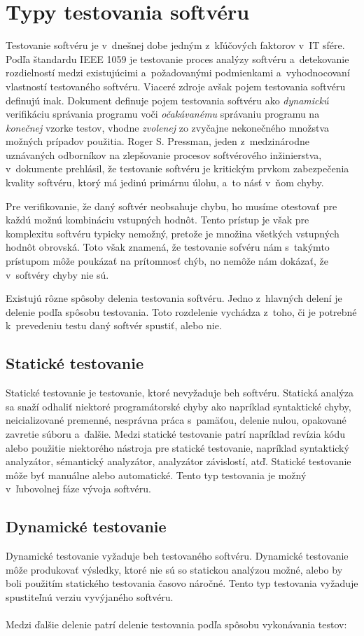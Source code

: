 \section{Typy testovania softvéru} 
\label{sekcia:typy_testovania}
Testovanie softvéru je v~dnešnej dobe jedným z~kľúčových faktorov v~IT sfére.
Podľa štandardu IEEE 1059 \cite{Ieee} je testovanie proces analýzy softvéru a~detekovanie rozdielností medzi 
existujúcimi a~požadovanými podmienkami a~vyhodnocovaní vlastností testovaného softvéru.
Viaceré zdroje avšak pojem testovania softvéru definujú inak.
Dokument \cite{Swebok} definuje pojem testovania softvéru ako {\it dynamickú} verifikáciu správania programu voči {\it očakávanému} správaniu programu na {\it konečnej} vzorke
testov, vhodne {\it zvolenej} zo zvyčajne nekonečného množstva možných prípadov použitia.
Roger S. Pressman, jeden z~medzinárodne uznávaných odborníkov na zlepšovanie procesov softvérového inžinierstva, v~dokumente \cite{Pressman} prehlásil, 
že testovanie softvéru je kritickým prvkom zabezpečenia kvality softvéru, ktorý má jedinú primárnu úlohu, a~to násť v~ňom chyby.  

Pre verifikovanie, že daný softvér neobsahuje chybu, ho musíme otestovať pre každú možnú kombináciu vstupných hodnôt.
Tento prístup je však pre komplexitu softvéru typicky nemožný, pretože je množina všetkých vstupných
hodnôt obrovská. Toto však znamená, že testovanie sofvéru nám s~takýmto prístupom môže poukázať na prítomnosť chýb, no nemôže nám
dokázať, že v~softvéry chyby nie sú.


Existujú rôzne spôsoby delenia testovania softvéru. Jedno z~hlavných delení je delenie podľa spôsobu testovania.
Toto rozdelenie vychádza z~toho, či je potrebné k~prevedeniu testu daný softvér spustiť, alebo nie.
\subsection*{Statické testovanie}
Statické testovanie je testovanie, ktoré nevyžaduje beh softvéru. Statická analýza sa snaží odhaliť niektoré
programátorské chyby ako napríklad syntaktické chyby, neicializované premenné, nesprávna práca s~pamäťou, delenie nulou, opakované zavretie súboru a~ďalšie. 
Medzi statické testovanie patrí napríklad revízia kódu alebo použitie niektorého nástroja pre statické testovanie, napríklad syntaktický analyzátor, sémantický
analyzátor, analyzátor závislostí, atď. Statické testovanie môže byť manuálne alebo automatické. Tento typ testovania je možný v~ľubovolnej fáze vývoja softvéru.
\subsection*{Dynamické testovanie}
Dynamické testovanie vyžaduje beh testovaného softvéru. Dynamické testovanie môže produkovať výsledky, ktoré nie sú so statickou analýzou možné, alebo 
by boli použitím statického testovania časovo náročné. Tento typ testovania vyžaduje spustiteľnú verziu vyvýjaného softvéru.
\\
\\
Medzi ďalšie delenie patrí delenie testovania podľa spôsobu vykonávania testov:
